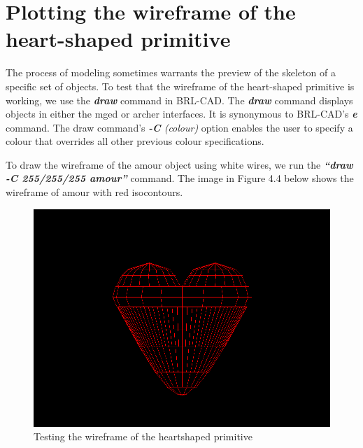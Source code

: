 \section{Plotting the wireframe of the heart­-shaped primitive}

\hspace{30} The   process   of   modeling   sometimes   warrants   the   preview   of   the   skeleton  
of   a   specific   set   of   objects.   To   test   that   the   wireframe   of   the   heart­-shaped  
primitive   is   working,   we   use   the   \textit{\textbf{draw}} \cite{40}   command   in   BRL­-CAD.   The   \textit{\textbf{draw}}  
command   displays   objects   in   either   the   mged   or   archer   interfaces.   It   is  
synonymous   to   BRL­-CAD's   \textit{\textbf{e}}   command.   The   draw   command's   \textit{\textbf{-­C} (colour)}  
option   enables   the   user   to   specify   a   colour   that   overrides   all   other   previous  
colour specifications.  

\hspace{30} To   draw   the   wireframe   of   the   amour   object   using   white   wires,   we   run   the  
\textit{\textbf{“draw -­C 255/255/255 amour”}}   command.   The   image   in   Figure   4.4   below   shows  
the wireframe of amour with red iso­contours.  

\begin{figure}[htbp]
\centering
\includegraphics[trim=0.0cm 0.5cm 0.1cm 0.1cm, clip=true, totalheight=0.4\textheight]{Pictures/Wireframe.png}
\caption[Testing the wireframe of the heart­shaped primitive]{Testing the wireframe of the heart­shaped primitive}
\label{Wireframe}
\end{figure}

